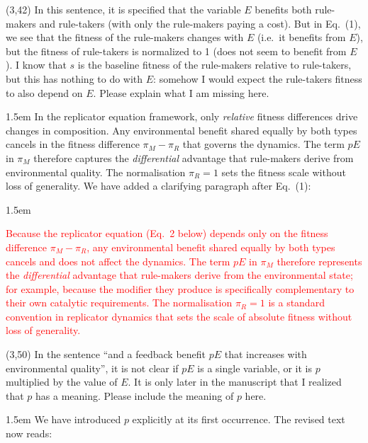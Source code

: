 \documentclass[11pt]{article}
\newcommand{\rev}[1]{\textcolor{red}{#1}}
\newcommand{\RC}[1]{\medskip\noindent #1\par}
\newenvironment{response}{\medskip\begin{adjustwidth}{1.5em}{}\color{blue}\mdseries\sloppy}{\end{adjustwidth}\color{black}}
\newenvironment{manuscript}{%
  \begin{adjustwidth}{1.5em}{}%
  \begin{mdframed}[
    topline=false, bottomline=false, rightline=false,
    linewidth=2pt, linecolor=red,
    innerleftmargin=1em, innerrightmargin=0pt,
    innertopmargin=0.4em, innerbottommargin=0.4em,
    skipabove=\medskipamount, skipbelow=\medskipamount
  ]\color{black}%
}{%
  \end{mdframed}%
  \end{adjustwidth}%
}
\begin{document}
\RC{(3,42) In this sentence, it is specified that the variable $E$ benefits both rule-makers and rule-takers (with only the rule-makers paying a cost). But in Eq.~(1), we see that the fitness of the rule-makers changes with $E$ (i.e.\ it benefits from $E$), but the fitness of rule-takers is normalized to 1 (does not seem to benefit from $E$). I know that $s$ is the baseline fitness of the rule-makers relative to rule-takers, but this has nothing to do with $E$: somehow I would expect the rule-takers fitness to also depend on $E$. Please explain what I am missing here.}

\begin{response}
In the replicator equation framework, only \emph{relative} fitness differences drive changes in composition. Any environmental benefit shared equally by both types cancels in the fitness difference $\pi_M - \pi_R$ that governs the dynamics. The term $pE$ in $\pi_M$ therefore captures the \emph{differential} advantage that rule-makers derive from environmental quality. The normalisation $\pi_R = 1$ sets the fitness scale without loss of generality. We have added a clarifying paragraph after Eq.~(1):
\end{response}

\begin{manuscript}\rev{Because the replicator equation (Eq.~2 below) depends only on the fitness difference $\pi_M - \pi_R$, any environmental benefit shared equally by both types cancels and does not affect the dynamics. The term $pE$ in $\pi_M$ therefore represents the \emph{differential} advantage that rule-makers derive from the environmental state; for example, because the modifier they produce is specifically complementary to their own catalytic requirements. The normalisation $\pi_R = 1$ is a standard convention in replicator dynamics that sets the scale of absolute fitness without loss of generality.}
\end{manuscript}

\RC{(3,50) In the sentence ``and a feedback benefit $pE$ that increases with environmental quality'', it is not clear if $pE$ is a single variable, or it is $p$ multiplied by the value of $E$. It is only later in the manuscript that I realized that $p$ has a meaning. Please include the meaning of $p$ here.}

\begin{response}
We have introduced $p$ explicitly at its first occurrence. The revised text now reads:
\end{response}
\end{document}
